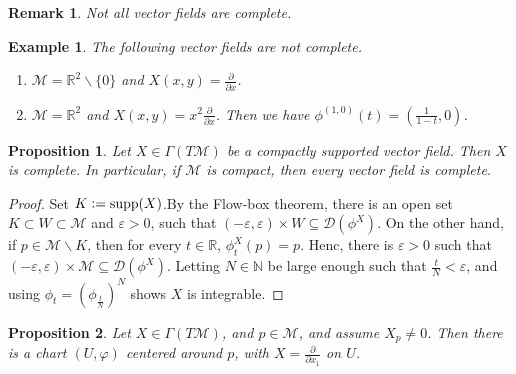 \documentclass[10pt]{article}
\newtheorem{proposition}{Proposition}[section]
\newtheorem{remark}{Remark}[section]
\newtheorem{example}{Example}[section]
\DeclareMathOperator{\supp}{supp}
\newcommand{\defeq}{\vcentcolon=}
\newcommand{\N}[0]{\mathbb{N}}
\newcommand{\R}[0]{\mathbb{R}}
\newcommand{\M}[0]{\mathcal{M}}
\newcommand{\pd}[2]{{\frac {\partial #1} {\partial #2}}}
\begin{document}
\begin{remark}
  Not all vector fields are complete. 
\end{remark}

\begin{example}
  The following vector fields are not complete.
  \begin{enumerate}[1).]
    \item $\M = \R^2\backslash\{0\}$ and $X(x,y) = \pd{}{x}$. 
    \item $\M = \R^2$ and $X(x,y) = x^2\pd{}{x}$. Then we have $\phi^{(1,0)}(t)=\left({\frac 1 {1-t}},0\right)$. 
  \end{enumerate}
\end{example}

\begin{proposition}
  Let $X\in\Gamma(T\M)$ be a compactly supported vector field. Then $X$ is complete. In particular, if $\M$ is compact, then every vector field is complete.
\end{proposition}

\begin{proof}
Set $K \defeq \supp(X)$.By the Flow-box theorem, there is an open set $K\subset W\subset \M$ and $\varepsilon>0$, such that 
$(-\varepsilon,\varepsilon) \times W\subseteq\mathcal{D}(\phi^X)$. On the other hand, if $p\in\M\backslash K$, then for every $t\in\R$, $\phi_t^X(p) = p$. Henc, there is $\varepsilon>0$ such that 
$(-\varepsilon,\varepsilon)\times \M\subseteq\mathcal{D}(\phi^X)$. Letting $N\in\N$ be large enough such that ${\frac t N}<\varepsilon$, and using $\phi_t = (\phi_{{\frac t N}})^N$ shows $X$ is integrable.
\end{proof}

\begin{proposition}
  Let $X\in\Gamma(T\M)$, and $p\in\M$, and assume $X_p\not =0$. Then there is a chart $(U,\varphi)$ centered around $p$, with $X = \pd{}{x_1}$ on $U$.
\end{proposition}
\end{document}
